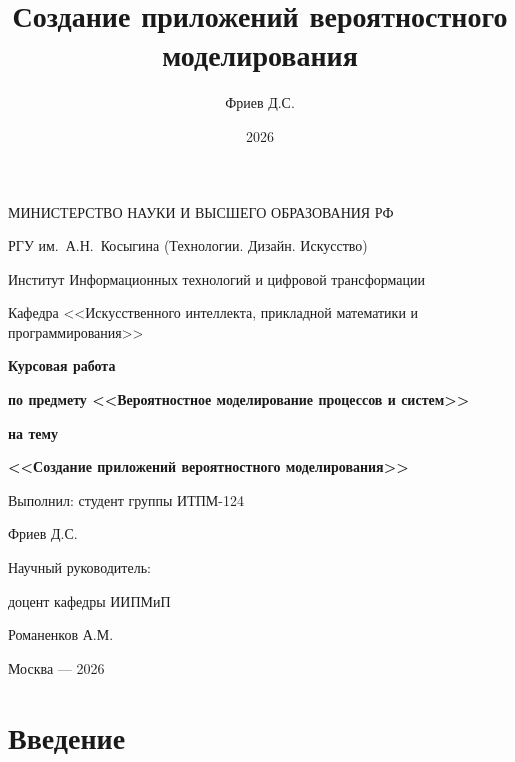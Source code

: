 \documentclass[14pt]{extarticle}
\date{}
\author{Фриев Д.С.}
\date{2026}
\title{Создание приложений вероятностного моделирования}
\begin{document}
\begin{titlepage}
\thispagestyle{empty}
\begin{center}
{\fontsize{14}{18}\selectfont
МИНИСТЕРСТВО НАУКИ И ВЫСШЕГО ОБРАЗОВАНИЯ РФ\par
\vspace{4mm}
РГУ им.\ А.Н.~Косыгина (Технологии. Дизайн. Искусство)\par
\vspace{4mm}
Институт Информационных технологий и цифровой трансформации\par
\vspace{4mm}
Кафедра <<Искусственного интеллекта, прикладной математики и программирования>>\par
}
\vspace{20mm}
{\fontsize{16}{24}\selectfont\bfseries Курсовая работа\par}
\vspace{6mm}
{\fontsize{16}{24}\selectfont\bfseries по предмету <<Вероятностное моделирование процессов и систем>>\par}
\vspace{6mm}
{\fontsize{16}{24}\selectfont\bfseries на тему\par}
\vspace{4mm}
{\fontsize{16}{24}\selectfont\bfseries <<Создание приложений вероятностного моделирования>>\par}
\vspace{30mm}
\begin{flushleft}
{\fontsize{14}{18}\selectfont
\hspace{60mm}Выполнил: студент группы ИТПМ-124\par
\hspace{60mm}Фриев Д.С.\par
\vspace{6mm}
\hspace{60mm}Научный руководитель:\par
\hspace{60mm}доцент кафедры ИИПМиП\par
\hspace{60mm}Романенков А.М.\par
}
\end{flushleft}
\vfill
{\fontsize{14}{18}\selectfont Москва --- 2026\par}
\end{center}
\end{titlepage}

\tableofcontents
\clearpage
\section{Введение}
\label{sec:org1c7cd5a}
\end{document}
